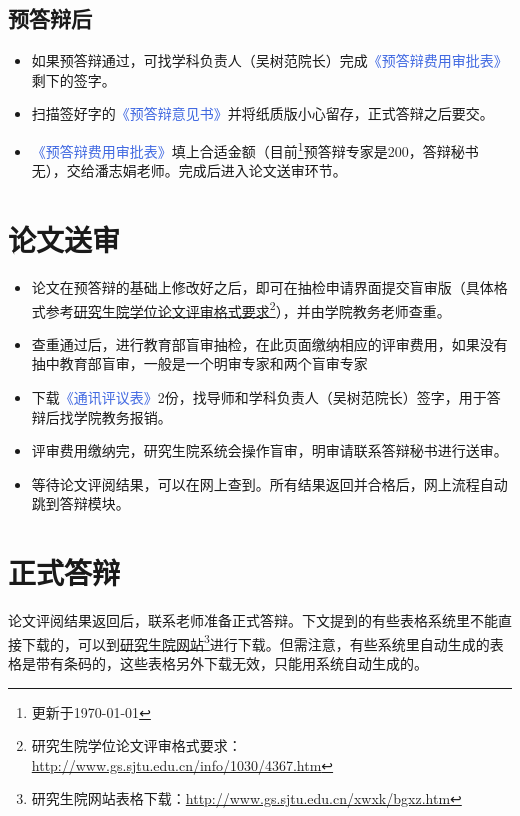 \documentclass[a4paper, 12pt]{ctexart}
\newcommand{\form}[1]{\textcolor{RoyalBlue}{《#1》}}
\begin{document}
\subsection{预答辩后}
\begin{itemize}
    \item 如果预答辩通过，可找学科负责人（吴树范院长）完成\form{预答辩费用审批表}剩下的签字。
    \item 扫描签好字的\form{预答辩意见书}并将纸质版小心留存，正式答辩之后要交。
    \item \form{预答辩费用审批表}填上合适金额（目前\footnote{更新于\today}预答辩专家是200，答辩秘书无），交给潘志娟老师。完成后进入论文送审环节。
\end{itemize}

\section{论文送审}

\begin{itemize}
    \item 论文在预答辩的基础上修改好之后，即可在抽检申请界面提交盲审版（具体格式参考\href{http://www.gs.sjtu.edu.cn/info/1030/4367.htm}{研究生院学位论文评审格式要求}\footnote{研究生院学位论文评审格式要求：\url{http://www.gs.sjtu.edu.cn/info/1030/4367.htm}}），并由学院教务老师查重。
    \item 查重通过后，进行教育部盲审抽检，在此页面缴纳相应的评审费用，如果没有抽中教育部盲审，一般是一个明审专家和两个盲审专家
    \item 下载\form{通讯评议表}2份，找导师和学科负责人（吴树范院长）签字，用于答辩后找学院教务报销。
    \item 评审费用缴纳完，研究生院系统会操作盲审，明审请联系答辩秘书进行送审。
    \item %
    等待论文评阅结果，可以在网上查到。所有结果返回并合格后，网上流程自动跳到答辩模块。
\end{itemize}

\section{正式答辩}
论文评阅结果返回后，联系老师准备正式答辩。下文提到的有些表格系统里不能直接下载的，可以到\href{http://www.gs.sjtu.edu.cn/xwxk/bgxz.htm}{研究生院网站}\footnote{研究生院网站表格下载：\url{http://www.gs.sjtu.edu.cn/xwxk/bgxz.htm}}进行下载。但需注意，有些系统里自动生成的表格是带有条码的，这些表格另外下载无效，只能用系统自动生成的。
\end{document}
